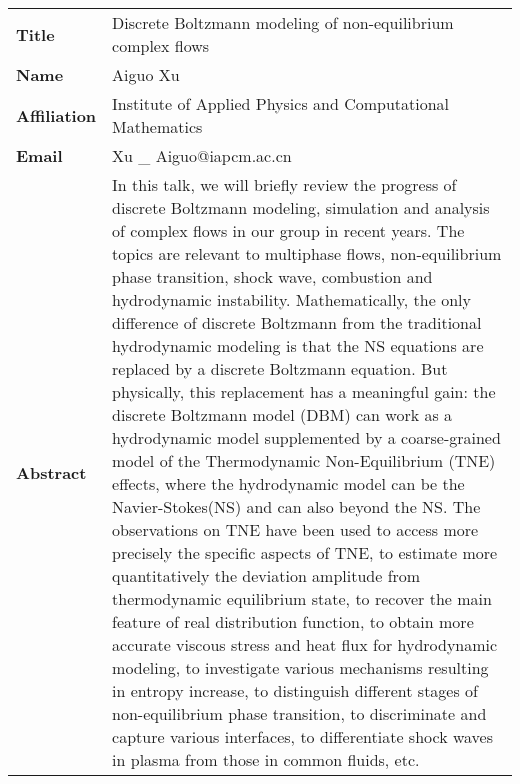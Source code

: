 \documentclass[oneside,A4paper,12pt]{article}
\begin{document}
\begin{longtable}{p{2cm}p{14cm}}
\toprule
\textbf{Title} & Discrete Boltzmann modeling of non-equilibrium complex flows\\
\textbf{Name} & Aiguo Xu\\
\textbf{Affiliation} & Institute of Applied Physics and Computational Mathematics\\
\textbf{Email} & Xu \_ Aiguo@iapcm.ac.cn\\
\textbf{Abstract} & In this talk, we will briefly review the progress of discrete Boltzmann modeling, simulation and analysis of complex flows in our group in recent years. The topics are relevant to multiphase flows, non-equilibrium phase transition, shock wave, combustion and hydrodynamic instability. Mathematically, the only difference of discrete Boltzmann from the traditional hydrodynamic modeling is that the NS equations are replaced by a discrete Boltzmann equation. But physically, this replacement has a meaningful gain: the discrete Boltzmann model (DBM) can work as a hydrodynamic model supplemented by a coarse-grained model of the Thermodynamic Non-Equilibrium (TNE) effects, where the hydrodynamic model can be the Navier-Stokes(NS) and can also beyond the NS. The observations on TNE have been used to access more precisely the specific aspects of TNE, to estimate more quantitatively the deviation amplitude from thermodynamic equilibrium state, to recover the main feature of real distribution function, to obtain more accurate viscous stress and heat flux for hydrodynamic modeling, to investigate various mechanisms resulting in entropy increase, to distinguish different stages of non-equilibrium phase transition, to discriminate and capture various interfaces, to differentiate shock waves in plasma from those in common fluids, etc.\\
\bottomrule
\end{longtable}

\newpage
\end{document}
